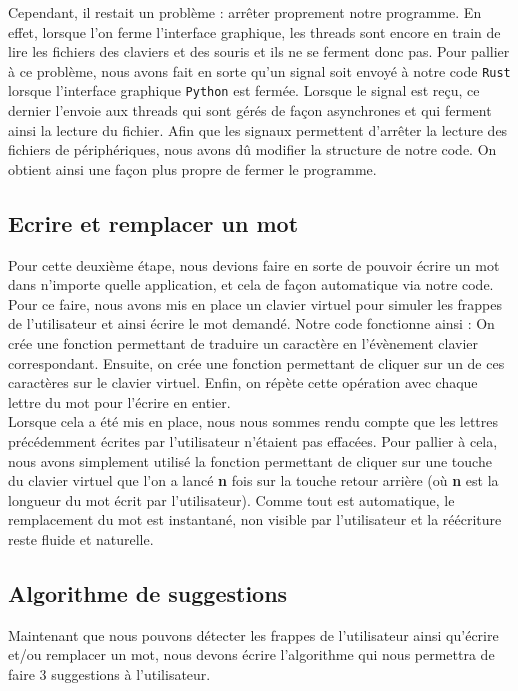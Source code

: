 \documentclass[a4paper, 11pt]{report}
\newcommand{\langage}[1]{\texttt{#1}}
\begin{document}
{Cependant, il restait un problème : arrêter proprement notre programme. En effet, lorsque l'on ferme l'interface graphique, les threads sont encore en train de lire les fichiers des claviers et des souris et ils ne se ferment donc pas. Pour pallier à ce problème, nous avons fait en sorte qu'un signal soit envoyé à notre code \langage{Rust} lorsque l'interface graphique \langage{Python} est fermée. Lorsque le signal est reçu, ce dernier l'envoie aux threads qui sont gérés de façon asynchrones et qui ferment ainsi la lecture du fichier. Afin que les signaux permettent d'arrêter la lecture des fichiers de périphériques, nous avons dû modifier la structure de notre code. On obtient ainsi une façon plus propre de fermer le programme.

\subsection{Ecrire et remplacer un mot}

Pour cette deuxième étape, nous devions faire en sorte de pouvoir écrire un mot dans n'importe quelle application, et cela de façon automatique via notre code. Pour ce faire,  nous avons mis en place un clavier virtuel pour simuler les frappes de l'utilisateur et ainsi écrire le mot demandé. Notre code fonctionne ainsi : On crée une fonction permettant de traduire un caractère en l'évènement clavier correspondant. Ensuite, on crée une fonction permettant de cliquer sur un de ces caractères sur le clavier virtuel. Enfin, on répète cette opération avec chaque lettre du mot pour l'écrire en entier.\\

\newpage
Lorsque cela a été mis en place, nous nous sommes rendu compte que les lettres précédemment écrites par l'utilisateur n'étaient pas effacées. Pour pallier à cela, nous avons simplement utilisé la fonction permettant de cliquer sur une touche du clavier virtuel que l'on a lancé \textbf{n} fois sur la touche retour arrière (où \textbf{n} est la longueur du mot écrit par l'utilisateur). Comme tout est automatique, le remplacement du mot est instantané, non visible par l'utilisateur et la réécriture reste fluide et naturelle.

\subsection{Algorithme de suggestions}

Maintenant que nous pouvons détecter les frappes de l'utilisateur ainsi qu'écrire et/ou remplacer un mot, nous devons écrire l'algorithme qui nous permettra de faire 3 suggestions à l'utilisateur.\par

}
\end{document}

